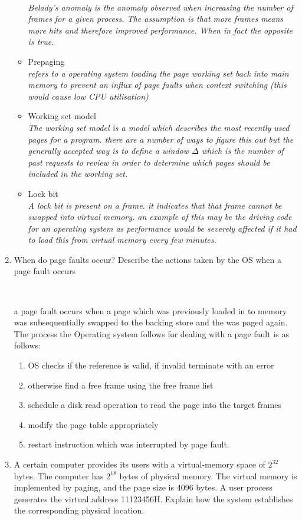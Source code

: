 \documentclass{article}
\newcommand{\answercolor}{Bittersweet}
\newcommand{\answer}[1]{{\\\color{\answercolor}\footnotesize\itshape{#1}}}
\begin{document}
\begin{enumerate}
\begin{itemize}
                \answer{Belady's anomaly is the anomaly observed when increasing the number of frames for a given process. The assumption is that more frames means more hits and therefore improved performance. When in fact the opposite is true.}
				\item Prepaging
                \answer{refers to a operating system loading the page working set back into main memory to prevent an influx of page faults when context switching (this would cause low CPU utilisation)}
				\item Working set model
                \answer{The working set model is a model which describes the most recently used pages for a program. there are a number of ways to figure this out but the generally accepted way is to define a window $\Delta$ which is the number of past requests to review in order to determine which pages should be included in the working set.}
				\item Lock bit
                \answer{A lock bit is present on a frame. it indicates that that frame cannot be swapped into virtual memory. an example of this may be the driving code for an operating system as performance would be severely affected if it had to load this from virtual memory every few minutes.}
			\end{itemize}
		\item When do page faults occur? Describe the actions taken by the OS when a page fault occurs
        \answer{
        a page fault occurs when a page which was previously loaded in to memory was subsequentially swapped to the backing store and the was paged again. The process the Operating system follows for dealing with a page fault is as follows:
        \begin{enumerate}
            \item OS checks if the reference is valid, if invalid terminate with an error
            \item otherwise find a free frame using the free frame list
            \item schedule a disk read operation to read the page into the target frames
            \item modify the page table appropriately
            \item restart instruction which was interrupted by page fault.
        \end{enumerate}
        }
		\item A certain computer provides its users with a virtual-memory space of $2^{32}$ bytes. The computer has $2^{18}$ bytes of physical memory. The virtual memory is implemented by paging, and the page size is 4096 bytes. A user process generates the virtual address 11123456H. Explain how the system establishes the corresponding physical location.

\end{enumerate}
\end{document}

